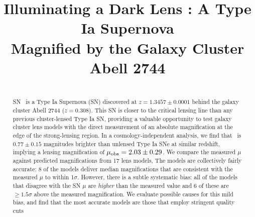 







\title{Illuminating a Dark Lens : A Type Ia Supernova \\ Magnified by the Galaxy Cluster Abell 2744}




\begin{abstract}
\\
SN \tomas\ is a Type Ia Supernova (SN) discovered at
$z=1.3457\pm0.0001$ behind the galaxy cluster Abell 2744
($z=0.308$). This SN 
is closer to the critical lensing line than any
previous cluster-lensed Type Ia SN, 
providing a valuable
opportunity to test galaxy cluster lens models
with the direct measurement of an absolute magnification at the edge
of the strong-lensing region.  
In a cosmology-independent analysis, we find that \tomas\ is
$0.77\pm0.15$ magnitudes brighter than unlensed Type Ia SNe at similar
redshift, implying a lensing magnification of 
$\mu_{\rm obs}=2.03\pm0.29$. 
  We compare the measured $\mu$
against predicted magnifications from 17 lens models,   The models are collectively
fairly accurate: 8 of the models deliver median magnifications that
are consistent with the measured $\mu$ to within 1$\sigma$.  However,
there is a subtle systematic bias: all of the models that disagree
with the SN $\mu$
are {\it higher} than the measured value and 6 of these
are $\geq1.5\sigma$ above the measured magnification.  We
evaluate possible causes for this mild bias,
and find that
the most accurate models are those that employ stringent quality cuts
\end{abstract}

